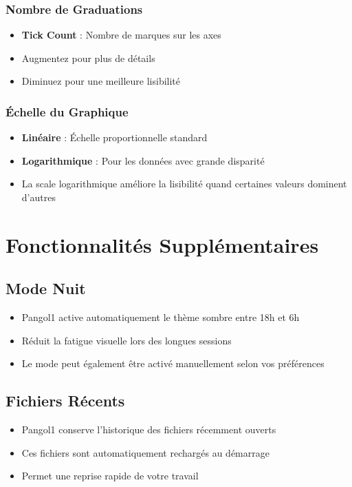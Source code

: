 \documentclass[11pt, a4paper]{article}
\begin{document}
\subsubsection{Nombre de Graduations}
\begin{itemize}
    \item \textbf{Tick Count} : Nombre de marques sur les axes
    \item Augmentez pour plus de détails
    \item Diminuez pour une meilleure lisibilité
\end{itemize}

\subsubsection{Échelle du Graphique}
\begin{itemize}
    \item \textbf{Linéaire} : Échelle proportionnelle standard
    \item \textbf{Logarithmique} : Pour les données avec grande disparité
    \item La scale logarithmique améliore la lisibilité quand certaines valeurs dominent d'autres
\end{itemize}

\section{Fonctionnalités Supplémentaires}

\subsection{Mode Nuit}
\begin{itemize}
    \item Pangol1 active automatiquement le thème sombre entre 18h et 6h
    \item Réduit la fatigue visuelle lors des longues sessions
    \item Le mode peut également être activé manuellement selon vos préférences
\end{itemize}

\subsection{Fichiers Récents}
\begin{itemize}
    \item Pangol1 conserve l'historique des fichiers récemment ouverts
    \item Ces fichiers sont automatiquement rechargés au démarrage
    \item Permet une reprise rapide de votre travail
\end{itemize}
\end{document}
